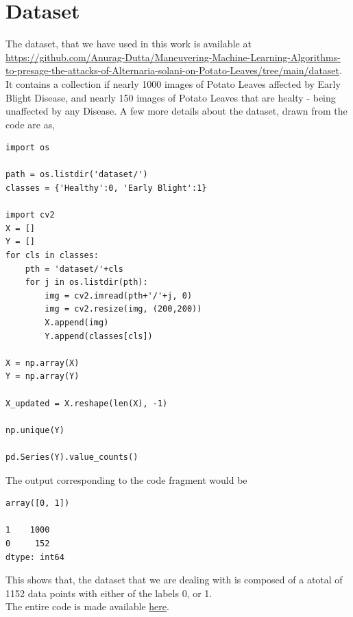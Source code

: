 \documentclass[conference]{IEEEtran}
\begin{document}
\section{Dataset}
The dataset, that we have used in this work is available at \href{https://github.com/Anurag-Dutta/Maneuvering-Machine-Learning-Algorithms-to-presage-the-attacks-of-Alternaria-solani-on-Potato-Leaves/tree/main/dataset}{https://github.com/Anurag-Dutta/Maneuvering-Machine-Learning-Algorithms-to-presage-the-attacks-of-Alternaria-solani-on-Potato-Leaves/tree/main/dataset}. It contains a collection if nearly 1000 images of Potato Leaves affected by Early Blight Disease, and nearly 150 images of Potato Leaves that are healty - being unaffected by any Disease. A few more details about the dataset, drawn from the code are as, 
\begin{verbatim}
import os

path = os.listdir('dataset/')
classes = {'Healthy':0, 'Early Blight':1}

import cv2
X = []
Y = []
for cls in classes:
    pth = 'dataset/'+cls
    for j in os.listdir(pth):
        img = cv2.imread(pth+'/'+j, 0)
        img = cv2.resize(img, (200,200))
        X.append(img)
        Y.append(classes[cls])
        
X = np.array(X)
Y = np.array(Y)

X_updated = X.reshape(len(X), -1)

np.unique(Y)

pd.Series(Y).value_counts()
\end{verbatim}
The output corresponding to the code fragment would be 
\begin{verbatim}
array([0, 1])

1    1000
0     152
dtype: int64
\end{verbatim}
This shows that, the dataset that we are dealing with is composed of a atotal of 1152 data points with either of the labels 0, or 1. \\

The entire code is made available \href{https://github.com/Anurag-Dutta/Maneuvering-Machine-Learning-Algorithms-to-presage-the-attacks-of-Alternaria-solani-on-Potato-Leaves/blob/main/Maneuvering\%20Machine\%20Learning\%20Algorithms\%20to\%20presage\%20the\%20attacks\%20of\%20Alternaria\%20solani\%20on\%20Potato\%20Leaves.ipynb}{here}. 
\end{document}
